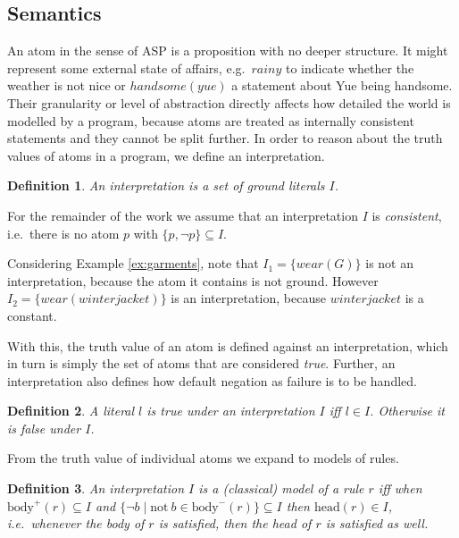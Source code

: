 \documentclass{vutinfth} %
\newtheorem{definition}{Definition}[section]
\newcommand{\headf}{\mathrm{head}}
\newcommand{\bodyf}{\mathrm{body}}
\newcommand{\fail}{\mathrm{not } \ \xspace}
\begin{document}
\subsection{Semantics}

An atom in the sense of ASP is a proposition with no deeper structure. It might represent some external state of affairs, e.g.~$rainy$ to indicate whether the weather is not nice or $handsome(yue)$ a statement about Yue being handsome. Their granularity or level of abstraction directly affects how detailed the world is modelled by a program, because atoms are treated as internally consistent statements and they cannot be split further.
In order to reason about the truth values of atoms in a program, we define an interpretation.

\begin{definition}
An \emph{interpretation} is a set of ground literals $I$.
\end{definition}

For the remainder of the work we assume that an interpretation $I$ is \emph{consistent}, i.e.~there is no atom $p$ with $\{p, \neg p\} \subseteq I$.


Considering Example \ref{ex:garments}, note that $I_1 = \{ wear(G) \}$ is not an interpretation, because the atom it contains is not ground. However $I_2 = \{ wear(winterjacket) \}$ is an interpretation, because $winterjacket$ is a constant.

With this, the truth value of an atom is defined against an interpretation, which in turn is simply the set of atoms that are considered \emph{true}. Further, an interpretation also defines how default negation as failure is to be handled.

\begin{definition}
A literal $l$ is \emph{true} under an interpretation $I$ iff $l \in I$. Otherwise it is \emph{false} under $I$.%
\end{definition}

From the truth value of individual atoms we expand to models of rules.

\begin{definition}
An interpretation $I$ is a \emph{(classical) model} of a rule $r$ iff when $\bodyf^+(r) \subseteq I$ and $\{ \neg b \mid \fail b \in \bodyf^-(r) \} \subseteq I$ then $\headf(r) \in I$, i.e.~whenever the body of $r$ is satisfied, then the head of $r$ is satisfied as well.
\end{definition}
\end{document}
